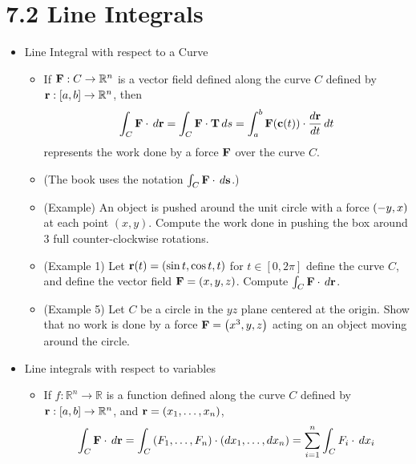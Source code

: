 \documentclass[11pt]{article}
\begin{document}
\section*{7.2 Line Integrals}

\begin{itemize}
  \item Line Integral with respect to a Curve
    \begin{itemize}
      \item If \(\mathbf{F}:C\to\mathbb R^n\) is a vector field defined
            along the curve \(C\) defined by \(\mathbf{r}:[a,b]\to\mathbb R^n\),
            then
            \[
              \int_C \mathbf{F}\cdot\,d\mathbf{r}
                =
              \int_C \mathbf{F}\cdot\mathbf{T}\,d s
                =
              \int_a^b \mathbf{F}(\mathbf{c}(t))\cdot \frac{d\mathbf{r}}{dt}\,d t
            \]
            represents the work done by a force \(\mathbf{F}\) over the curve
            \(C\).
      \item (The book uses the notation \(
              \int_C \mathbf{F}\cdot\,d\mathbf{s}
            \).)
      \item (Example) An object is pushed around the unit circle with
            a force \(\left(-y,x\right)\) at each point \((x,y)\). Compute the
            work done in pushing the box around \(3\) full counter-clockwise
            rotations.
      \item (Example 1) Let \(\mathbf{r}(t)=\left(\sin t,\cos t,t\right)\)
            for \(t\in[0,2\pi]\)
            define the curve \(C\), and define the vector field
            \(\mathbf{F}=\left(x,y,z\right)\). Compute
            \(\int_C\mathbf{F}\cdot\,d\mathbf{r}\).
      \item (Example 5) Let \(C\) be a circle in the \(yz\) plane centered
            at the origin.
            Show that no work is done by a force \(\mathbf{F}=\left(x^3,y,z\right)\)
            acting on an object moving around the circle.
    \end{itemize}
  \item Line integrals with respect to variables
    \begin{itemize}
      \item If \(f:\mathbb R^n\to\mathbb R\) is a function defined
            along the curve \(C\) defined by \(\mathbf{r}:[a,b]\to\mathbb R^n\),
            and \(\mathbf{r}=\left(x_1,\dots,x_n\right)\),
            \[
              \int_C \mathbf{F}\cdot\,d\mathbf{r}
                =
              \int_C \left(F_1,\dots,F_n\right)\cdot\left(dx_1,\dots,dx_n\right)
                =
              \sum_{i=1}^n \int_C F_i\cdot\,d x_i
\]
\end{itemize}
\end{itemize}
\end{document}
